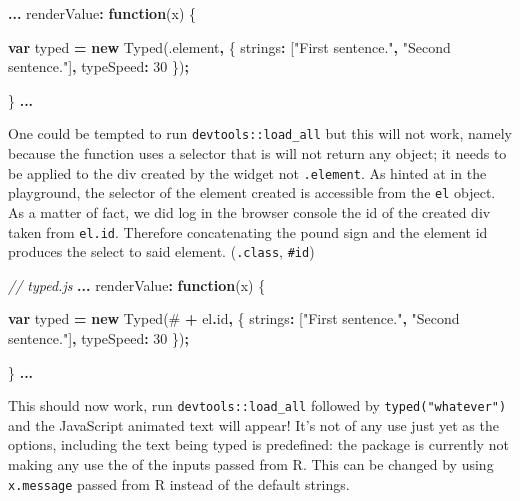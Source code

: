 \documentclass[
]{krantz}
\makeatletter
\newenvironment{Shaded}{\begin{snugshade}}{\end{snugshade}}
\newcommand{\AttributeTok}[1]{\textcolor[rgb]{0.61,0.61,0.61}{#1}}
\newcommand{\CommentTok}[1]{\textcolor[rgb]{0.37,0.37,0.37}{\textit{#1}}}
\newcommand{\DataTypeTok}[1]{\textcolor[rgb]{0.27,0.27,0.27}{#1}}
\newcommand{\DecValTok}[1]{\textcolor[rgb]{0.06,0.06,0.06}{#1}}
\newcommand{\KeywordTok}[1]{\textcolor[rgb]{0.27,0.27,0.27}{\textbf{#1}}}
\newcommand{\NormalTok}[1]{#1}
\newcommand{\OperatorTok}[1]{\textcolor[rgb]{0.43,0.43,0.43}{\textbf{#1}}}
\newcommand{\StringTok}[1]{\textcolor[rgb]{0.5,0.5,0.5}{#1}}
\newenvironment{kframe}{%
\medskip{}
\setlength{\fboxsep}{.8em}
 \def\at@end@of@kframe{}%
 \ifinner\ifhmode%
  \def\at@end@of@kframe{\end{minipage}}%
  \begin{minipage}{\columnwidth}%
 \fi\fi%
 \def\FrameCommand##1{\hskip\@totalleftmargin \hskip-\fboxsep
 \colorbox{shadecolor}{##1}\hskip-\fboxsep
     \hskip-\linewidth \hskip-\@totalleftmargin \hskip\columnwidth}%
 \MakeFramed {\advance\hsize-\width
   \@totalleftmargin\z@ \linewidth\hsize
   \@setminipage}}%
 {\par\unskip\endMakeFramed%
 \at@end@of@kframe}
\renewenvironment{Shaded}{\begin{kframe}}{\end{kframe}}
\makeatother
\begin{document}
\begin{Shaded}
\begin{Highlighting}[]
\OperatorTok{...}
\NormalTok{renderValue}\OperatorTok{:} \KeywordTok{function}\NormalTok{(x) \{}

  \KeywordTok{var}\NormalTok{ typed }\OperatorTok{=} \KeywordTok{new}\NormalTok{ Typed(}\StringTok{\textquotesingle{}.element\textquotesingle{}}\OperatorTok{,}\NormalTok{ \{}
    \DataTypeTok{strings}\OperatorTok{:}\NormalTok{ [}\StringTok{"First sentence."}\OperatorTok{,} \StringTok{"Second sentence."}\NormalTok{]}\OperatorTok{,}
    \DataTypeTok{typeSpeed}\OperatorTok{:} \DecValTok{30}
\NormalTok{  \})}\OperatorTok{;}

\NormalTok{\}}
\OperatorTok{...}
\end{Highlighting}
\end{Shaded}

One could be tempted to run \texttt{devtools::load\_all} but this will not work, namely because the function uses a selector that is will not return any object; it needs to be applied to the div created by the widget not \texttt{.element}. As hinted at in the playground, the selector of the element created is accessible from the \texttt{el} object. As a matter of fact, we did log in the browser console the id of the created div taken from \texttt{el.id}. Therefore concatenating the pound sign and the element id produces the select to said element. (\texttt{.class}, \texttt{\#id})

\begin{Shaded}
\begin{Highlighting}[]
\CommentTok{// typed.js}
\OperatorTok{...}
\NormalTok{renderValue}\OperatorTok{:} \KeywordTok{function}\NormalTok{(x) \{}

  \KeywordTok{var}\NormalTok{ typed }\OperatorTok{=} \KeywordTok{new}\NormalTok{ Typed(}\StringTok{\textquotesingle{}\#\textquotesingle{}} \OperatorTok{+}\NormalTok{ el}\OperatorTok{.}\AttributeTok{id}\OperatorTok{,}\NormalTok{ \{}
    \DataTypeTok{strings}\OperatorTok{:}\NormalTok{ [}\StringTok{"First sentence."}\OperatorTok{,} \StringTok{"Second sentence."}\NormalTok{]}\OperatorTok{,}
    \DataTypeTok{typeSpeed}\OperatorTok{:} \DecValTok{30}
\NormalTok{  \})}\OperatorTok{;}

\NormalTok{\}}
\OperatorTok{...}
\end{Highlighting}
\end{Shaded}

This should now work, run \texttt{devtools::load\_all} followed by \texttt{typed("whatever")} and the JavaScript animated text will appear! It's not of any use just yet as the options, including the text being typed is predefined: the package is currently not making any use the of the inputs passed from R. This can be changed by using \texttt{x.message} passed from R instead of the default strings.
\end{document}
